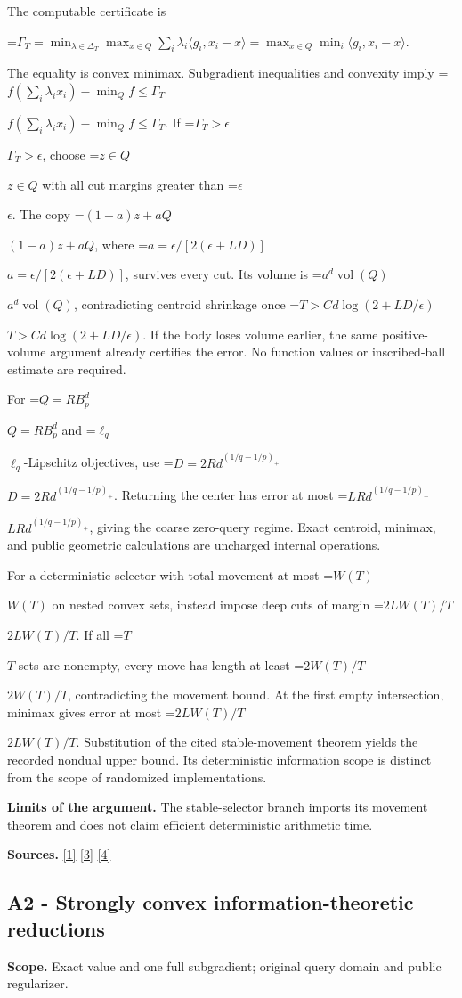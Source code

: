 \documentclass[10pt,a4paper]{article}
\newcommand{\AtlasMath}[1]{\par\begingroup\centering\setbox0=\hbox{$\displaystyle #1$}\ifdim\wd0>1.4\linewidth\typeout{ATLAS WIDE FORMULA: \the\wd0}\fi\ifdim\wd0>\linewidth\resizebox{\linewidth}{!}{\box0}\else\box0\fi\par\endgroup}
\newcommand{\AtlasInlineMath}[1]{\begingroup\setbox0=\hbox{$#1$}\ifdim\wd0>.4\linewidth\endgroup\AtlasMath{#1}\else\endgroup$#1$\fi}
\begin{document}
The computable certificate is

\AtlasMath{\Gamma_T=\min_{\lambda\in\Delta_T}\max_{x\in Q}\sum_i\lambda_i\langle g_i,x_i-x\rangle
=\max_{x\in Q}\min_i\langle g_i,x_i-x\rangle.}

The equality is convex minimax. Subgradient inequalities and convexity imply
\AtlasInlineMath{f(\sum_i\lambda_ix_i)-\min_Qf\le\Gamma_T}.
If \AtlasInlineMath{\Gamma_T>\epsilon}, choose \AtlasInlineMath{z\in Q} with all cut margins greater than \AtlasInlineMath{\epsilon}. The copy \AtlasInlineMath{(1-a)z+aQ}, where \AtlasInlineMath{a=\epsilon/[2(\epsilon+LD)]}, survives every cut. Its volume is \AtlasInlineMath{a^d\operatorname{vol}(Q)}, contradicting centroid shrinkage once \AtlasInlineMath{T>C d\log(2+LD/\epsilon)}. If the body loses volume earlier, the same positive-volume argument already certifies the error. No function values or inscribed-ball estimate are required.

For \AtlasInlineMath{Q=RB_p^d} and \AtlasInlineMath{\ell_q}-Lipschitz objectives, use \AtlasInlineMath{D=2Rd^{(1/q-1/p)_+}}. Returning the center has error at most \AtlasInlineMath{LRd^{(1/q-1/p)_+}}, giving the coarse zero-query regime. Exact centroid, minimax, and public geometric calculations are uncharged internal operations.

For a deterministic selector with total movement at most \AtlasInlineMath{W(T)} on nested convex sets, instead impose deep cuts of margin \AtlasInlineMath{2LW(T)/T}. If all \AtlasInlineMath{T} sets are nonempty, every move has length at least \AtlasInlineMath{2W(T)/T}, contradicting the movement bound. At the first empty intersection, minimax gives error at most \AtlasInlineMath{2LW(T)/T}. Substitution of the cited stable-movement theorem yields the recorded nondual upper bound. Its deterministic information scope is distinct from the scope of randomized implementations.

\textbf{Limits of the argument.} The stable-selector branch imports its movement theorem and does not claim efficient deterministic arithmetic time.

\textbf{Sources.} \href{https://arxiv.org/pdf/1405.4980}{[1]} \href{https://www2.isye.gatech.edu/~nemirovs/MOR_AccuracyCertificates.pdf}{[3]} \href{https://arxiv.org/pdf/2609.20701}{[4]}

\subsection{A2 - Strongly convex information-theoretic reductions}
\textbf{Scope.} Exact value and one full subgradient; original query domain and public regularizer.
\end{document}
